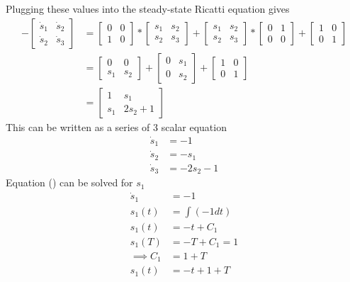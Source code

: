 \documentclass{article}
\begin{document}
  Plugging these values into the steady-state Ricatti equation gives
  \begin{align*}
	  -\begin{bmatrix}
		  \dot{s}_1 & \dot{s}_2 \\
		  \dot{s}_2 & \dot{s}_3 
	  \end{bmatrix} &=
	  \begin{bmatrix}
		  0 & 0 \\
		  1 & 0
	  \end{bmatrix} *
	  \begin{bmatrix}
		  s_1 & s_2 \\
		  s_2 & s_3
	  \end{bmatrix} + 
	  \begin{bmatrix}
		  s_1 & s_2 \\
		  s_2 & s_3
	  \end{bmatrix} *
	  \begin{bmatrix}
		  0 & 1 \\
		  0 & 0
	  \end{bmatrix} +
	  \begin{bmatrix}
		  1 & 0 \\
		  0 & 1
	  \end{bmatrix} \\
          &=\begin{bmatrix}
		  0 & 0 \\
		  s_1 & s_2
	  \end{bmatrix} + 
          \begin{bmatrix}
		  0 & s_1 \\
		  0 & s_2
	  \end{bmatrix} +
	  \begin{bmatrix}
		  1 & 0 \\
		  0 & 1
	  \end{bmatrix} \\
	  &=\begin{bmatrix}
		  1 & s_1 \\
		  s_1 & 2s_2+1
	  \end{bmatrix}
  \end{align*}
  This can be written as a series of 3 scalar equation
  \begin{align*}
	  \dot{s}_1&=-1 \\
	  \dot{s}_2&=-s_1 \\
	  \dot{s}_3&=-2s_2-1
  \end{align*}
  Equation () can be solved for $s_1$
  \begin{align*}
	  \dot{s}_1&=-1 \\
	  s_1(t)&=\int(-1dt) \\
	  s_1(t)&=-t+C_1 \\
	  s_1(T)&=-T+C_1=1 \\
	  \implies C_1&=1+T \\
	  s_1(t)&=-t+1+T
  \end{align*}
\end{document}
